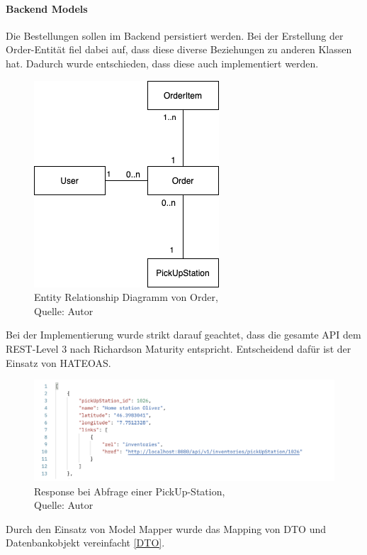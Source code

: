\paragraph{Backend Models}
Die Bestellungen sollen im Backend persistiert werden. Bei der Erstellung der Order-Entität fiel dabei auf, dass diese diverse Beziehungen zu anderen Klassen hat. Dadurch wurde entschieden, dass diese auch implementiert werden. 
 \begin{figure}[H]
	\centering
	\includegraphics[scale=0.5]{images/erdOrder.PNG}
	\caption[Entity Relationship Diagramm von Order]{Entity Relationship Diagramm von Order,\\ Quelle: Autor}
	\label{img: erdOrder}
\end{figure} 
Bei der Implementierung wurde strikt darauf geachtet, dass die gesamte API dem REST-Level 3 nach  Richardson Maturity entspricht. Entscheidend dafür ist der Einsatz von \ac{HATEOAS}. 
 \begin{figure}[H]
	\centering
	\includegraphics[scale=0.5]{images/pickUpJSON.PNG}
	\caption[Response bei Abfrage einer PickUp-Station]{Response bei Abfrage einer PickUp-Station,\\ Quelle: Autor}
	\label{img: responseRequest}
\end{figure} 

Durch den Einsatz von Model Mapper wurde das Mapping von DTO und Datenbankobjekt vereinfacht \ref{DTO}. 




